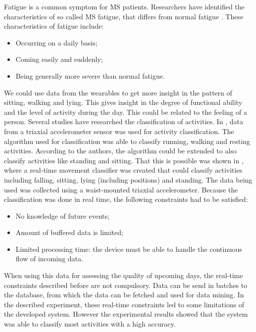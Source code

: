Fatigue is a common symptom for MS patients. 
Researchers have identified the characteristics of so called MS fatigue, that differs from normal fatigue \cite{msfatique}.
These characteristics of fatigue include:
%
\begin{itemize}
	\item Occurring on a daily basis;
	\item Coming easily and suddenly;
	\item Being generally more severe than normal fatigue.
\end{itemize}
%
We could use data from the wearables to get more insight in the pattern of sitting, walking and lying. 
This gives insight in the degree of functional ability and the level of activity during the day.
This could be related to the feeling of a person.
Several studies have researched the classification of activities. 
In \cite{sharma2008frequency}, data from a triaxial accelerometer sensor was used for activity classification.  
The algorithm used for classification was able to classify running, walking and resting activities. 
According to the authors, the algorithm could be extended to also classify activities like standing and sitting.
That this is possible was shown in \cite{karantonis2006implementation}, where a real-time movement classifier was created that could classify activities including falling, sitting, lying (including positions) and standing.
The data being used was collected using a waist-mounted triaxial accelerometer. 
Because the classification was done in real time, the following constraints had to be satisfied:
%
\begin{itemize}
	\item No knowledge of future events;
	\item Amount of buffered data is limited;
	\item Limited processing time: the device must be able to handle the continuous flow of incoming data.
\end{itemize}
% 
When using this data for assessing the quality of upcoming days, the real-time constraints described before are not compulsory.
Data can be send in batches to the database, from which the data can be fetched and used for data mining.
In the described experiment, these real-time constraints led to some limitations of the developed system.
However the experimental results showed that the system was able to classify most activities with a high accuracy.

